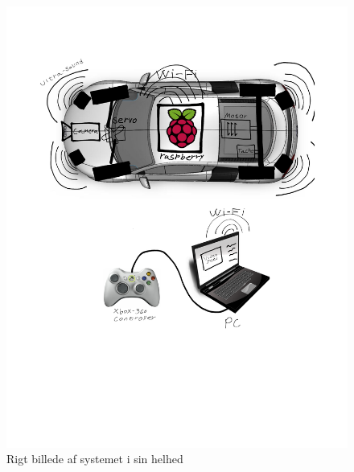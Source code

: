 \begin{figure}[h]
\centering
\includegraphics[width=\textwidth - 7.38 cm]{../fig/billeder/rigbillede}
\caption{Rigt billede af systemet i sin helhed}
\label{fig:rigbillede}
\end{figure}

\clearpage


 					 